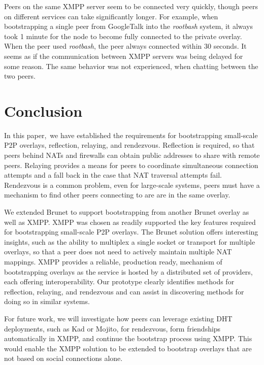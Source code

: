 \documentclass[conference]{IEEEtran}
\begin{document}
Peers on the same XMPP server seem to be connected very quickly, though peers
on different services can take significantly longer.  For example, when
bootstrapping a single peer from GoogleTalk into the \textit{rootbash} system,
it always took 1 minute for the node to become fully connected to the private
overlay.  When the peer used \textit{rootbash}, the peer always connected
within 30 seconds.  It seems as if the communication between XMPP servers was
being delayed for some reason.  The same behavior was not experienced, when
chatting between the two peers.

\section{Conclusion}
\label{conclusions}

In this paper, we have established the requirements for bootstrapping
small-scale P2P overlays, reflection, relaying, and rendezvous.  Reflection is
required, so that peers behind NATs and firewalls can obtain public addresses
to share with remote peers.  Relaying provides a means for peers to coordinate
simultaneous connection attempts and a fall back in the case that NAT traversal
attempts fail.  Rendezvous is a common problem, even for large-scale systems,
peers must have a mechanism to find other peers connecting to are are in the
same overlay.  

We extended Brunet to support bootstrapping from another Brunet overlay as well
as XMPP.  XMPP was chosen as readily supported the key features required for
bootstrapping small-scale P2P overlays.  The Brunet solution offers interesting
insights, such as the ability to multiplex a single socket or transport for
multiple overlays, so that a peer does not need to actively maintain multiple
NAT mappings.  XMPP provides a reliable, production ready, mechanism of
bootstrapping overlays as the service is hosted by a distributed set of
providers, each offering interoperability.  Our prototype clearly identifies
methods for reflection, relaying, and rendezvous and can assist in discovering
methods for doing so in similar systems.

For future work, we will investigate how peers can leverage existing DHT
deployments, such as Kad or Mojito, for rendezvous, form friendships
automatically in XMPP, and continue the bootstrap process using XMPP.  This
would enable the XMPP solution to be extended to bootstrap overlays that are
not based on social connections alone.




\suppressfloats
\end{document}
